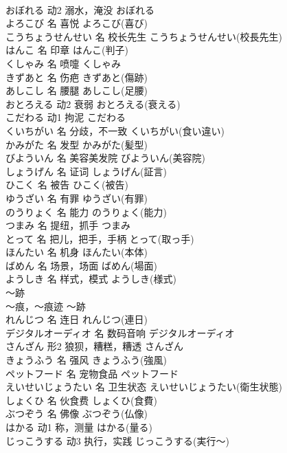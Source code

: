 \documentclass[8pt]{extreport}
\begin{document}
\begin{CJK}{UTF8}{min}
\\	おぼれる	动2	溺水，淹没	おぼれる	
\\	よろこび	名	喜悦	よろこび(喜び)	
\\	こうちょうせんせい	名	校长先生	こうちょうせんせい(校長先生)	
\\	はんこ	名	印章	はんこ(判子)	
\\	くしゃみ	名	喷嚏	くしゃみ	
\\	きずあと	名	伤疤	きずあと(傷跡)	
\\	あしこし	名	腰腿	あしこし(足腰)	
\\	おとろえる	动2	衰弱	おとろえる(衰える)	
\\	こだわる	动1	拘泥	こだわる	
\\	くいちがい	名	分歧，不一致	くいちがい(食い違い)	
\\	かみがた	名	发型	かみがた(髪型)	
\\	びよういん	名	美容美发院	びよういん(美容院)	
\\	しょうげん	名	证词	しょうげん(証言)	
\\	ひこく	名	被告	ひこく(被告)	
\\	ゆうざい	名	有罪	ゆうざい(有罪)	
\\	のうりょく	名	能力	のうりょく(能力)	
\\	つまみ	名	提纽，抓手	つまみ	
\\	とって	名	把儿，把手，手柄	とって(取っ手)	
\\	ほんたい	名	机身	ほんたい(本体)	
\\	ばめん	名	场景，场面	ばめん(場面)	
\\	ようしき	名	样式，模式	ようしき(様式)	
\\	～跡	
\\	～痕，～痕迹	～跡	
\\	れんじつ	名	连日	れんじつ(連日)	
\\	デジタルオーディオ	名	数码音响	デジタルオーディオ	
\\	さんざん	形2	狼狈，糟糕，糟透	さんざん	
\\	きょうふう	名	强风	きょうふう(強風)	
\\	ペットフード	名	宠物食品	ペットフード	
\\	えいせいじょうたい	名	卫生状态	えいせいじょうたい(衛生状態)	
\\	しょくひ	名	伙食费	しょくひ(食費)	
\\	ぶつぞう	名	佛像	ぶつぞう(仏像)	
\\	はかる	动1	称，测量	はかる(量る)	
\\	じっこうする	动3	执行，实践	じっこうする(実行～)	

\end{CJK}
\end{document}
